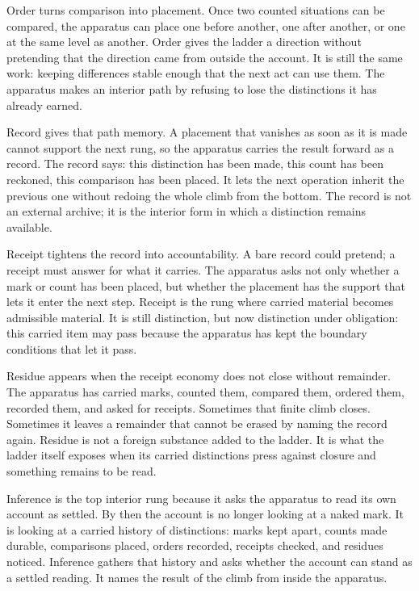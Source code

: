 Order turns comparison into placement. Once two counted situations can be
compared, the apparatus can place one before another, one after another, or one
at the same level as another. Order gives the ladder a direction without
pretending that the direction came from outside the account. It is still the
same work: keeping differences stable enough that the next act can use them.
The apparatus makes an interior path by refusing to lose the distinctions it
has already earned.

Record gives that path memory. A placement that vanishes as soon as it is made
cannot support the next rung, so the apparatus carries the result forward as a
record. The record says: this distinction has been made, this count has been
reckoned, this comparison has been placed. It lets the next operation inherit
the previous one without redoing the whole climb from the bottom. The record is
not an external archive; it is the interior form in which a distinction remains
available.

Receipt tightens the record into accountability. A bare record could pretend;
a receipt must answer for what it carries. The apparatus asks not only whether
a mark or count has been placed, but whether the placement has the support
that lets it enter the next step. Receipt is the rung where carried material
becomes admissible material. It is still distinction, but now distinction
under obligation: this carried item may pass because the apparatus has kept
the boundary conditions that let it pass.

Residue appears when the receipt economy does not close without remainder. The
apparatus has carried marks, counted them, compared them, ordered them,
recorded them, and asked for receipts. Sometimes that finite climb closes.
Sometimes it leaves a remainder that cannot be erased by naming the record
again. Residue is not a foreign substance added to the ladder. It is what the
ladder itself exposes when its carried distinctions press against closure and
something remains to be read.

Inference is the top interior rung because it asks the apparatus to read its
own account as settled. By then the account is no longer looking at a naked
mark. It is looking at a carried history of distinctions: marks kept apart,
counts made durable, comparisons placed, orders recorded, receipts checked,
and residues noticed. Inference gathers that history and asks whether the
account can stand as a settled reading. It names the result of the climb from
inside the apparatus.

